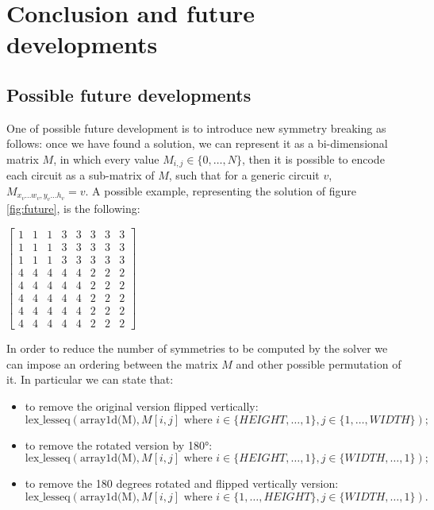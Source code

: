 \section{Conclusion and future developments}
\subsection{Possible future developments}
One of possible future development is to introduce new symmetry breaking as follows: once we have found a solution, we can represent it as a bi-dimensional matrix $M$, in which every value $M_{i,j} \in \{0,\dots,N\}$, then it is possible to encode each circuit as a sub-matrix of $M$, such that for a generic circuit $v$, $M_{x_{v} \dots w_v, y_v \dots h_v} = v$. A possible example, representing the solution of figure \ref{fig:future}, is the following:
\begin{center}
    $ \begin{bmatrix}
        1 & 1 & 1 & 3 & 3 & 3 & 3 & 3 \\
        1 & 1 & 1 & 3 & 3 & 3 & 3 & 3 \\
        1 & 1 & 1 & 3 & 3 & 3 & 3 & 3 \\
        4 & 4 & 4 & 4 & 4 & 2 & 2 & 2  \\
        4 & 4 & 4 & 4 & 4 & 2 & 2 & 2  \\
        4 & 4 & 4 & 4 & 4 & 2 & 2 & 2  \\
        4 & 4 & 4 & 4 & 4 & 2 & 2 & 2  \\
        4 & 4 & 4 & 4 & 4 & 2 & 2 & 2
    \end{bmatrix}  $
    \label{Solution as Matrix}
\end{center}

In order to reduce the number of symmetries to be computed by the solver we can impose an ordering between the matrix $M$ and other possible permutation of it. In particular we can state that:
\begin{itemize}
    \item to remove the original version flipped vertically:
        \begin{equation*}
            \text{lex\_lesseq}(\text{array1d(M)}, M[i, j] \text{ where } i \in \{HEIGHT,\dots,1\}, j \in \{1, \dots, WIDTH\});
        \end{equation*}
    \item to remove the rotated version by 180°:
        \begin{equation*}
            \text{lex\_lesseq}(\text{array1d(M)}, M[i, j] \text{ where } i \in \{HEIGHT,\dots,1\}, j \in \{WIDTH, \dots, 1\});
        \end{equation*}
    \item to remove the 180 degrees rotated and flipped vertically version:
        \begin{equation*}
            \text{lex\_lesseq}(\text{array1d(M)}, M[i, j] \text{ where } i \in \{1,\dots,HEIGHT\}, j \in \{WIDTH, \dots, 1\}).
        \end{equation*}
\end{itemize}


